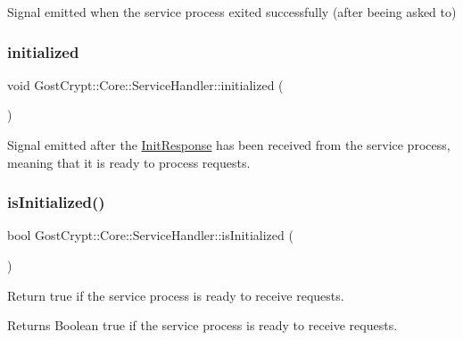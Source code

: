 Signal emitted when the service process exited successfully (after beeing asked to) 

\mbox{\label{class_gost_crypt_1_1_core_1_1_service_handler_a1b4dac1bf837fe46c9c99a7e77ef7990}} 
\subsubsection{\texorpdfstring{initialized}{initialized}}
{\footnotesize\ttfamily void Gost\+Crypt\+::\+Core\+::\+Service\+Handler\+::initialized (\begin{DoxyParamCaption}{ }\end{DoxyParamCaption})\hspace{0.3cm}{\ttfamily [signal]}}



Signal emitted after the \hyperlink{struct_gost_crypt_1_1_core_1_1_init_response}{Init\+Response} has been received from the service process, meaning that it is ready to process requests. 

\mbox{\label{class_gost_crypt_1_1_core_1_1_service_handler_aaae64d87599cb8ea04563081b9dffe66}} 
\subsubsection{\texorpdfstring{is\+Initialized()}{isInitialized()}}
{\footnotesize\ttfamily bool Gost\+Crypt\+::\+Core\+::\+Service\+Handler\+::is\+Initialized (\begin{DoxyParamCaption}{ }\end{DoxyParamCaption})\hspace{0.3cm}{\ttfamily [protected]}}



Return true if the service process is ready to receive requests. 

\begin{DoxyReturn}{Returns}
Boolean true if the service process is ready to receive requests. 
\end{DoxyReturn}


